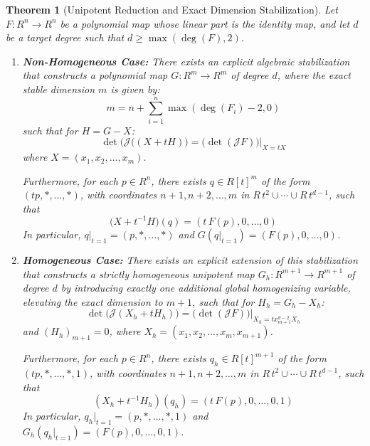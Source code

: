 \documentclass[11pt,a4paper]{article}
\newtheorem{theorem}{Theorem}[section]
\begin{document}
\begin{theorem}[Unipotent Reduction and Exact Dimension Stabilization]
\label{thm:unipotent_main}
Let $F: R^n \to R^n$ be a polynomial map whose linear part is the identity map, and let $d$ be a target degree such that $d \ge \max(\deg(F),2)$. 
\begin{enumerate}
    \item \textbf{Non-Homogeneous Case:} There exists an explicit algebraic stabilization that constructs a polynomial map  $G: R^m \to R^m$ of degree $d$, where the exact stable dimension $m$ is given by:
    \begin{equation}
    m = n + \sum_{i=1}^{n} \max(\deg(F_i) - 2, 0)
    \end{equation}
    such that for $H = G - X$:
    \begin{equation}
    \det \big(\mathcal{J} ((X + t H)\big) = \big(\det (\mathcal{J} F)\big)\big|_{X = t X}
    \end{equation}
    where $X = (x_1, x_2, \ldots, x_m)$.
            
    Furthermore, for each $p \in R^n$, there exists $q \in R[t]^m$ of the form $(tp, *, \ldots, *)$, with coordinates $n+1, n+2, \ldots, m$ in $R\,t^2 \cup \cdots \cup R\,t^{d-1}$, such that
    \begin{equation}
    \big(X + t^{-1}H)(q) = (t\, F(p), 0, \ldots, 0)
    \end{equation}
    In particular, $q|_{t=1} = (p, *, \ldots, *)$ and $G(q|_{t=1}) = (F(p), 0, \ldots, 0)$.
    
    \item \textbf{Homogeneous Case:} There exists an explicit extension of this stabilization that constructs a strictly homogeneous unipotent map $G_h: R^{m+1} \to R^{m+1}$ of degree $d$ by introducing exactly one additional global homogenizing variable, elevating the exact dimension to $m+1$, such that for $H_h = G_h - X_h$:
     \begin{equation}
    \det \big(\mathcal{J} (X_h + t H_h)\big) = \big(\det (\mathcal{J} F)\big)\big|_{X_h = t x_{m+1}^{d-2} X_h}
    \end{equation}        
    and $(H_h)_{m+1} = 0$, where $X_h = (x_1, x_2, \ldots, x_m, x_{m+1})$.
    
    Furthermore, for each $p \in R^n$, there exists $q_h \in R[t]^{m + 1}$ of the form $(tp, *, \ldots, *, 1)$, with coordinates $n+1, n+2, \ldots, m$ in $R\,t^2 \cup \cdots \cup R\,t^{d-1}$, such that
    \begin{equation}
    (X_h + t^{-1}H_h)(q_h) = (t\, F(p), 0, \ldots, 0, 1)
    \end{equation}
    In particular, $q_h|_{t=1} = (p, *, \ldots, *, 1)$ and $G_h(q_h|_{t=1}) = (F(p), 0, \ldots, 0, 1)$.
    
\end{enumerate}
\end{theorem}
\end{document}
